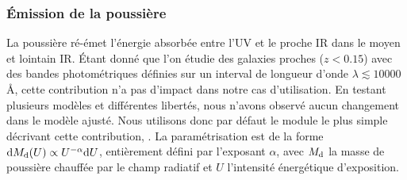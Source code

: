 \documentclass[../main/main.tex]{subfiles}
\begin{document}
\subsubsection{\'Emission de la poussière}

La poussière ré-émet l'énergie absorbée entre l'UV et le proche IR dans
le moyen et lointain IR. \'Etant donné que l'on étudie des galaxies
proches ($z<0.15$) avec des bandes photométriques définies sur un
interval de longueur d'onde
${\lambda\lesssim10000}$ \AA, cette contribution n'a pas d'impact
dans notre cas d'utilisation. En testant plusieurs modèles et
différentes libertés, nous n'avons observé aucun changement dans le modèle ajusté. Nous utilisons donc par défaut le module le plus
simple décrivant cette contribution, \textbf{}
\citep{Dale2014}. La paramétrisation est de la forme ${\mathrm{d} M_{\mathrm{d}}(U)\propto
U^{-\alpha}\mathrm{d} U}$, entièrement défini par l'exposant $\alpha$, avec
$M_{\mathrm{d}}$ la masse de poussière chauffée par le champ radiatif et $U$ l'intensité énergétique d'exposition.
\end{document}
